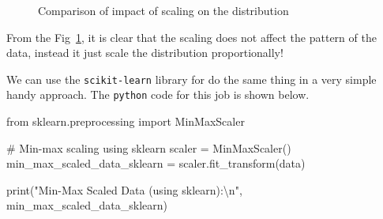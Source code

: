 \documentclass[
  letterpaper,
  DIV=11,
  numbers=noendperiod]{scrreprt}
\newenvironment{Shaded}{\begin{snugshade}}{\end{snugshade}}
\newcommand{\BuiltInTok}[1]{\textcolor[rgb]{0.00,0.23,0.31}{#1}}
\newcommand{\CharTok}[1]{\textcolor[rgb]{0.13,0.47,0.30}{#1}}
\newcommand{\CommentTok}[1]{\textcolor[rgb]{0.37,0.37,0.37}{#1}}
\newcommand{\ImportTok}[1]{\textcolor[rgb]{0.00,0.46,0.62}{#1}}
\newcommand{\NormalTok}[1]{\textcolor[rgb]{0.00,0.23,0.31}{#1}}
\newcommand{\OperatorTok}[1]{\textcolor[rgb]{0.37,0.37,0.37}{#1}}
\newcommand{\StringTok}[1]{\textcolor[rgb]{0.13,0.47,0.30}{#1}}
\theoremstyle{plain}
\theoremstyle{definition}
\theoremstyle{remark}
\begin{document}
\begin{figure}[H]


\caption{\label{fig-scatter}Comparison of impact of scaling on the
distribution}

\end{figure}%

From the Fig~\ref{fig-scatter}, it is clear that the scaling does not
affect the pattern of the data, instead it just scale the distribution
proportionally!

We can use the \texttt{scikit-learn} library for do the same thing in a
very simple handy approach. The \texttt{python} code for this job is
shown below.

\begin{Shaded}
\begin{Highlighting}[]
\ImportTok{from}\NormalTok{ sklearn.preprocessing }\ImportTok{import}\NormalTok{ MinMaxScaler}

\CommentTok{\# Min{-}max scaling using sklearn}
\NormalTok{scaler }\OperatorTok{=}\NormalTok{ MinMaxScaler()}
\NormalTok{min\_max\_scaled\_data\_sklearn }\OperatorTok{=}\NormalTok{ scaler.fit\_transform(data)}

\BuiltInTok{print}\NormalTok{(}\StringTok{"Min{-}Max Scaled Data (using sklearn):}\CharTok{\textbackslash{}n}\StringTok{"}\NormalTok{, min\_max\_scaled\_data\_sklearn)}
\end{Highlighting}
\end{Shaded}
\end{document}

